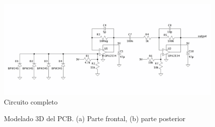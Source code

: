 \documentclass[a4paper,conference]{IEEEtran}
\begin{document}
            \begin{figure}[!t]
                \centering
                \includegraphics[width=\linewidth]{img/circuito.png}
                \caption{Circuito completo}
                \label{fig:circ}
            \end{figure}

            \begin{figure}[!t]
                \centering
                \hfil
                \caption{Modelado 3D del PCB. (a) Parte frontal, (b) parte
                posterior}
                \label{fig:pcb}
            \end{figure}
\end{document}
